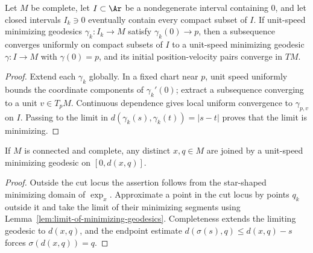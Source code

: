 \begin{lemma}
\label{lem:limit-of-minimizing-geodesics}




Let $M$ be complete, let $I\subset\Ar$ be a nondegenerate interval
containing $0$, and let closed intervals $I_k\ni0$ eventually contain
every compact subset of $I$. If unit-speed minimizing geodesics
$\gamma_k\colon I_k\to M$ satisfy $\gamma_k(0)\to p$, then a subsequence
converges uniformly on compact subsets of $I$ to a unit-speed minimizing
geodesic $\gamma\colon I\to M$ with $\gamma(0)=p$, and its initial
position-velocity pairs converge in $TM$.
\end{lemma}
\begin{proof}
\sketch
{}
Extend each $\gamma_k$ globally. In a fixed chart near $p$, unit speed
uniformly bounds the coordinate components of $\gamma_k'(0)$; extract a
subsequence converging to a unit $v\in T_pM$. Continuous dependence gives
local uniform convergence to $\gamma_{p,v}$ on $I$. Passing to the limit
in
$d(\gamma_k(s),\gamma_k(t))=|s-t|$ proves that the limit is minimizing.
\end{proof}

\begin{lemma}
\label{lem:minimizing-segment-exists}
\leanok



If $M$ is connected and complete, any distinct $x,q\in M$ are joined by
a unit-speed minimizing geodesic on $[0,d(x,q)]$.
\end{lemma}
\begin{proof}
\sketch
\leanok
{}
Outside the cut locus the assertion follows from the star-shaped
minimizing domain of $\exp_x$. Approximate a point in the cut locus by
points $q_k$ outside it and take the limit of their minimizing segments
using Lemma~\ref{lem:limit-of-minimizing-geodesics}. Completeness extends
the limiting geodesic to $d(x,q)$, and the endpoint estimate
$d(\sigma(s),q)\le d(x,q)-s$ forces $\sigma(d(x,q))=q$.
\end{proof}

